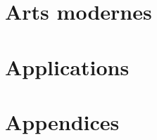 \documentclass[10pt, a4paper, oneside]{book}
\begin{document}




\part{Arts modernes}


% 


\part{Applications}



% 


\appendix


\part{Appendices}









\printbibliography[heading=bibintoc]
\printindex
\end{document}

